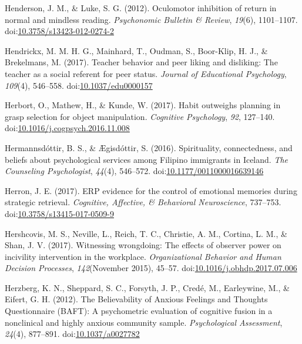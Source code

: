 \documentclass[english,man]{apa6}
\begin{document}
\hypertarget{ref-Henderson2012}{}
Henderson, J. M., \& Luke, S. G. (2012). Oculomotor inhibition of return
in normal and mindless reading. \emph{Psychonomic Bulletin \& Review},
\emph{19}(6), 1101--1107.
doi:\href{https://doi.org/10.3758/s13423-012-0274-2}{10.3758/s13423-012-0274-2}

\hypertarget{ref-Hendrickx2017}{}
Hendrickx, M. M. H. G., Mainhard, T., Oudman, S., Boor-Klip, H. J., \&
Brekelmans, M. (2017). Teacher behavior and peer liking and disliking:
The teacher as a social referent for peer status. \emph{Journal of
Educational Psychology}, \emph{109}(4), 546--558.
doi:\href{https://doi.org/10.1037/edu0000157}{10.1037/edu0000157}

\hypertarget{ref-Herbort2017}{}
Herbort, O., Mathew, H., \& Kunde, W. (2017). Habit outweighs planning
in grasp selection for object manipulation. \emph{Cognitive Psychology},
\emph{92}, 127--140.
doi:\href{https://doi.org/10.1016/j.cogpsych.2016.11.008}{10.1016/j.cogpsych.2016.11.008}

\hypertarget{ref-Hermannsdottir2016}{}
Hermannsdóttir, B. S., \& Ægisdóttir, S. (2016). Spirituality,
connectedness, and beliefs about psychological services among Filipino
immigrants in Iceland. \emph{The Counseling Psychologist}, \emph{44}(4),
546--572.
doi:\href{https://doi.org/10.1177/0011000016639146}{10.1177/0011000016639146}

\hypertarget{ref-Herron2017}{}
Herron, J. E. (2017). ERP evidence for the control of emotional memories
during strategic retrieval. \emph{Cognitive, Affective, \& Behavioral
Neuroscience}, 737--753.
doi:\href{https://doi.org/10.3758/s13415-017-0509-9}{10.3758/s13415-017-0509-9}

\hypertarget{ref-Hershcovis2017}{}
Hershcovis, M. S., Neville, L., Reich, T. C., Christie, A. M., Cortina,
L. M., \& Shan, J. V. (2017). Witnessing wrongdoing: The effects of
observer power on incivility intervention in the workplace.
\emph{Organizational Behavior and Human Decision Processes},
\emph{142}(November 2015), 45--57.
doi:\href{https://doi.org/10.1016/j.obhdp.2017.07.006}{10.1016/j.obhdp.2017.07.006}

\hypertarget{ref-Herzberg2012}{}
Herzberg, K. N., Sheppard, S. C., Forsyth, J. P., Credé, M., Earleywine,
M., \& Eifert, G. H. (2012). The Believability of Anxious Feelings and
Thoughts Questionnaire (BAFT): A psychometric evaluation of cognitive
fusion in a nonclinical and highly anxious community sample.
\emph{Psychological Assessment}, \emph{24}(4), 877--891.
doi:\href{https://doi.org/10.1037/a0027782}{10.1037/a0027782}
\end{document}
